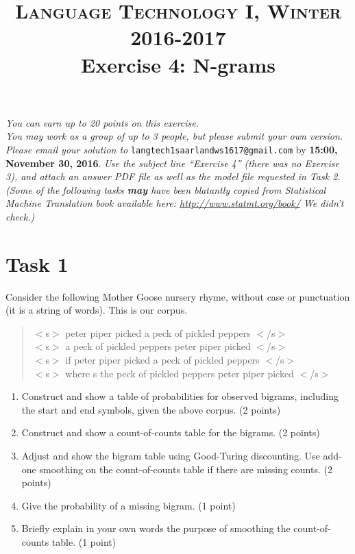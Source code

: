 \documentclass[paper=a4, fontsize=11pt]{scrartcl} %
\title{	
\vspace{-1.1cm}
\normalfont \normalsize 
\textsc{Language Technology I, Winter 2016-2017} \\ [25pt] %
\huge Exercise 4: N-grams \\ %
}
\date{} %
\numberwithin{equation}{section} %
\numberwithin{figure}{section} %
\numberwithin{table}{section} %
\begin{document}
\maketitle %


\vspace{-2cm}
\textit{You can earn up to 20 points on this exercise.\\
You may work as a group of up to 3 people, but please submit your own version.
}\\

\textit{Please email your solution to} \texttt{langtech1saarlandws1617@gmail.com} by \textbf{15:00, November 30, 2016}. \textit{Use the subject line ``Exercise 4'' (there was no Exercise 3), and attach an answer PDF file as well as the model file requested in Task 2. (Some of the following tasks \textbf{may} have been blatantly copied from Statistical Machine Translation book available here: \url{http://www.statmt.org/book/} We didn't check.)} \\

\section*{Task 1}
Consider the following Mother Goose nursery rhyme, without case or
punctuation (it is a string of words).  This is our corpus.
\begin{center}
\begin{quotation}
$<$s$>$ peter piper picked a peck of pickled peppers $<$/s$>$\\
$<$s$>$ a peck of pickled peppers peter piper picked $<$/s$>$\\
$<$s$>$ if peter piper picked a peck of pickled peppers $<$/s$>$\\
$<$s$>$ where s the peck of pickled peppers peter piper picked $<$/s$>$
\end{quotation}
\end{center}

\begin{enumerate}
\item Construct and show a table of probabilities for observed
  bigrams, including the start and end symbols, given the above
  corpus. (2 points)
\item Construct and show a count-of-counts table for the bigrams. (2 points)
\item Adjust and show the bigram table using Good-Turing discounting.
  Use add-one smoothing on the count-of-counts table if there are
  missing counts. (2 points)
\item Give the probability of a missing bigram. (1 point)
\item Briefly explain in your own words the purpose of smoothing the
  count-of-counts table. (1 point)
\end{enumerate}
\end{document}

